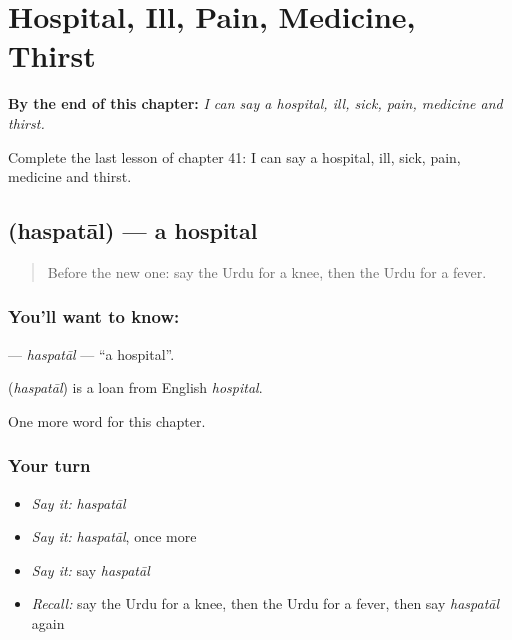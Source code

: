 
\chapter{Hospital, Ill, Pain, Medicine, Thirst}
\label{ch:ur-hospital-ill-pain-medicine-thirst}

\begin{chapteropening}
\textbf{By the end of this chapter:} \emph{I can say a hospital, ill, sick, pain, medicine and thirst.}

Complete the last lesson of chapter 41: I can say a hospital, ill, sick, pain, medicine and thirst.
\end{chapteropening}

\section[\texorpdfstring{\ur{ہسپتال} (haspatāl)}{ہسپتال (haspatāl)}]{ (haspatāl) — a hospital}

\label{lesson:UR-C41-haspatal}



\begin{quote}
Before the new one: say the Urdu for a knee, then the Urdu for a fever.
\end{quote}

\subsection*{You'll want to know: }
\textbf{} — \emph{haspatāl} — \textquotedblleft{}a hospital\textquotedblright{}.

\begin{cousinweb}
\textbf{} (\emph{haspatāl}) is a loan from English \emph{hospital}.
\end{cousinweb}

\begin{grammarlens}[title={What you've built}]
One more word for this chapter.
\end{grammarlens}

\subsection*{Your turn}
\begin{itemize}
\raggedright
  \item \emph{Say it:} \emph{haspatāl}
  \item \emph{Say it:} \emph{haspatāl}, once more
  \item \emph{Say it:} say \emph{haspatāl}
  \item \emph{Recall:} say the Urdu for a knee, then the Urdu for a fever, then say \emph{haspatāl} again
\end{itemize}

